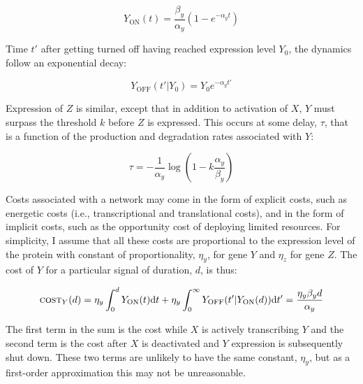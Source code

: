 \documentclass[dvips,12pt,twoside,titlepage]{article}
\newcommand{\ud}{\mathrm{d}}
\begin{document}
\begin{displaymath}
Y_{\mathrm{ON}}(t) = \frac{\beta_y}{\alpha_y}(1 - e^{-\alpha_y t})
\end{displaymath}

\vspace{0.6cm}

\noindent Time $t'$ after getting turned off having reached expression level $Y_{0}$, the dynamics follow an exponential decay:

\begin{displaymath}
Y_{\mathrm{OFF}}(t'|Y_{0}) = Y_{0}e^{-\alpha_y t'}
\end{displaymath}

\vspace{0.6cm}

Expression of $Z$ is similar, except that in addition to activation of $X$, $Y$ must surpass the threshold $k$ before $Z$ is expressed. This occurs at some delay, $\tau$, that is a function of the production and degradation rates associated with $Y$:

\begin{displaymath}
\tau = -\frac{1}{\alpha_y} \log(1-k\frac{\alpha_y}{\beta_y})
\end{displaymath}

\vspace{0.6cm}

Costs associated with a network may come in the form of explicit costs, such as energetic costs (i.e., transcriptional and translational costs), and in the form of implicit costs, such as the opportunity cost of deploying limited resources.
For simplicity, I assume that all these costs are proportional to the expression level of the protein with constant of proportionality, $\eta_y$, for gene $Y$ and $\eta_z$ for gene $Z$.
The cost of $Y$ for a particular signal of duration, $d$, is thus:

\begin{displaymath}
\textsc{cost}_Y(d) = \eta_y \int_{0}^{d} Y_{\mathrm{ON}}(t)\ud t + \eta_y \int_{0}^{\infty} Y_{\mathrm{OFF}}(t'|Y_{\mathrm{ON}}(d))\ud t' = \frac{\eta_y \beta_y d}{\alpha_y}
\end{displaymath}

\vspace{0.6cm}

\noindent The first term in the sum is the cost while $X$ is actively transcribing $Y$ and the second term is the cost after $X$ is deactivated and $Y$ expression is subsequently shut down. These two terms are unlikely to have the same constant, $\eta_y$, but as a first-order approximation this may not be unreasonable.
\end{document}
